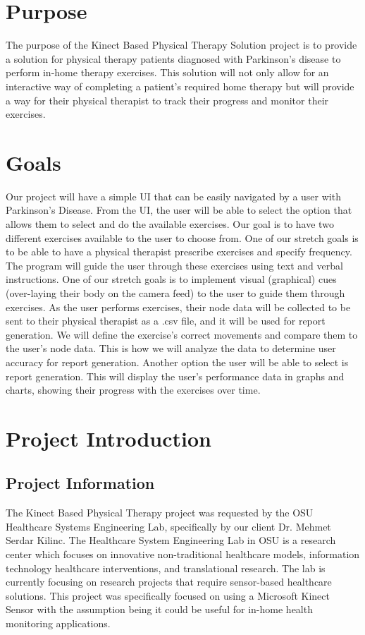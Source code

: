 \documentclass[onecolumn, draftclsnofoot,10pt, compsoc]{IEEEtran}
\begin{document}
\section{Purpose}
The purpose of the Kinect Based Physical Therapy Solution project is to provide a solution for physical therapy patients diagnosed with Parkinson's disease to perform in-home therapy exercises. This solution will not only allow for an interactive way of completing a patient's required home therapy but will provide a way for their physical therapist to track their progress and monitor their exercises.

\section{Goals}
Our project will have a simple UI that can be easily navigated by a user with Parkinson's Disease. From the UI, the user will be able to select the option that allows them to select and do the available exercises. Our goal is to have two different exercises available to the user to choose from. One of our stretch goals is to be able to have a physical therapist prescribe exercises and specify frequency. The program will guide the user through these exercises using text and verbal instructions. One of our stretch goals is to implement visual (graphical) cues (over-laying their body on the camera feed) to the user to guide them through exercises. As the user performs exercises, their node data will be collected to be sent to their physical therapist as a .csv file, and it will be used for report generation. We will define the exercise's correct movements and compare them to the user's node data. This is how we will analyze the data to determine user accuracy for report generation. Another option the user will be able to select is report generation. This will display the user's performance data in graphs and charts, showing their progress with the exercises over time. 

\section{Project Introduction}
\subsection{Project Information}
The Kinect Based Physical Therapy project was requested by the OSU Healthcare Systems Engineering Lab, specifically by our client Dr. Mehmet Serdar Kilinc. The Healthcare System Engineering Lab in OSU is a research center which focuses on innovative non-traditional healthcare models, information technology healthcare interventions, and translational research. The lab is currently focusing on research projects that require sensor-based healthcare solutions. This project was specifically focused on using a Microsoft Kinect Sensor with the assumption being it could be useful for in-home health monitoring applications.
\end{document}

